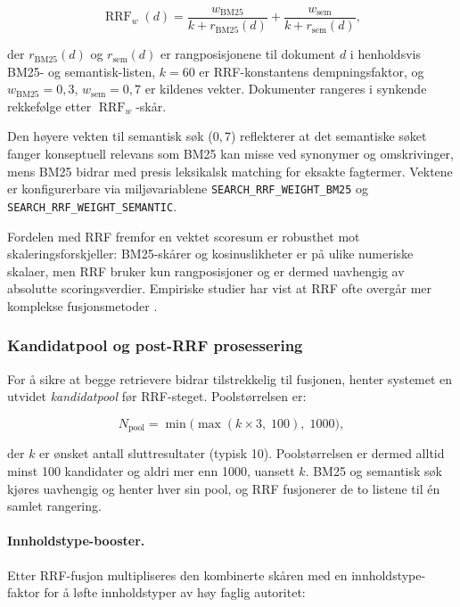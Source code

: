\begin{equation}
\operatorname{RRF}_w(d)
=
\frac{w_{\mathrm{BM25}}}{k + r_{\mathrm{BM25}}(d)}
+
\frac{w_{\mathrm{sem}}}{k + r_{\mathrm{sem}}(d)},
\end{equation}

der $r_{\mathrm{BM25}}(d)$ og $r_{\mathrm{sem}}(d)$ er rangposisjonene til
dokument $d$ i henholdsvis BM25- og semantisk-listen, $k = 60$ er
RRF-konstantens dempningsfaktor, og $w_{\mathrm{BM25}} = 0{,}3$,
$w_{\mathrm{sem}} = 0{,}7$ er kildenes vekter.
Dokumenter rangeres i synkende rekkefølge etter $\operatorname{RRF}_w$-skår.

Den høyere vekten til semantisk søk ($0{,}7$) reflekterer at det semantiske
søket fanger konseptuell relevans som BM25 kan misse ved synonymer og
omskrivinger, mens BM25 bidrar med presis leksikalsk matching for eksakte
fagtermer. Vektene er konfigurerbare via miljøvariablene
\texttt{SEARCH\_RRF\_WEIGHT\_BM25} og \texttt{SEARCH\_RRF\_WEIGHT\_SEMANTIC}.

Fordelen med RRF fremfor en vektet scoresum er robusthet mot
skaleringsforskjeller: BM25-skårer og kosinuslikheter er på ulike numeriske
skalaer, men RRF bruker kun rangposisjoner og er dermed uavhengig av
absolutte scoringsverdier. Empiriske studier har vist at RRF ofte overgår mer
komplekse fusjonsmetoder \cite{cormack2009reciprocal}.

\subsubsection{Kandidatpool og post-RRF prosessering}
\label{sec:kandidatpool}

For å sikre at begge retrievere bidrar tilstrekkelig til fusjonen, henter
systemet en utvidet \textit{kandidatpool} før RRF-steget. Poolstørrelsen er:

\[
N_{\text{pool}} = \min\!\bigl(\max(k \times 3,\; 100),\; 1000\bigr),
\]

der $k$ er ønsket antall sluttresultater (typisk 10). Poolstørrelsen er
dermed alltid minst 100 kandidater og aldri mer enn 1000, uansett $k$.
BM25 og semantisk søk kjøres uavhengig og henter hver sin pool, og RRF
fusjonerer de to listene til én samlet rangering.

\paragraph{Innholdstype-booster.}
Etter RRF-fusjon multipliseres den kombinerte skåren med en
innholdstype-faktor for å løfte innholdstyper av høy faglig autoritet:


